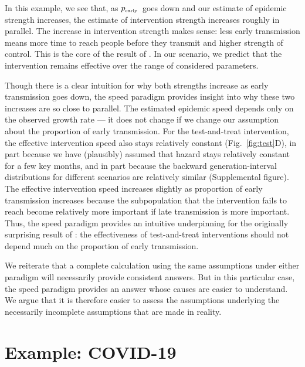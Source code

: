 \documentclass[12pt]{article}
\newcommand{\tsub}[2]{#1_{{\textrm{\tiny #2}}}}
\newcommand{\pEarly}{\ensuremath{\tsub{p}{early}}}
\newcommand{\figref}[1]{Fig.~\ref{fig:#1}}
\begin{document}
In this example, we see that, as \pEarly\ goes down and our estimate of epidemic strength increases, the estimate of intervention strength increases roughly in parallel. The increase in intervention strength makes sense: less early transmission means more time to reach people before they transmit and higher strength of control. This is the core of the result of \cite{eaton2014proportion}. 
In our scenario, we predict that the intervention remains effective over the range of considered parameters.

Though there is a clear intuition for why both strengths increase as early transmission goes down, the speed paradigm provides insight into why these two increases are so close to parallel.
The estimated epidemic speed depends only on the observed growth rate --- it does not change if we change our assumption about the proportion of early transmission.
For the test-and-treat intervention, the effective intervention speed also stays relatively constant (\figref{test}D), in part because we have (plausibly) assumed that hazard stays relatively constant for a few key months, and in part because the backward generation-interval distributions for different scenarios are relatively similar (Supplemental figure).
The effective intervention speed increases slightly as proportion of early transmission increases because the subpopulation that the intervention fails to reach become relatively more important if late transmission is more important.
Thus, the speed paradigm provides an intuitive underpinning for the originally surprising result of \cite{eaton2014proportion}: the effectiveness of test-and-treat interventions should not depend much on the proportion of early transmission.

We reiterate that a complete calculation using the same assumptions under either paradigm will necessarily provide consistent answers. But in this particular case, the speed paradigm provides an answer whose causes are easier to understand. We argue that it is therefore easier to assess the assumptions underlying the necessarily incomplete assumptions that are made in reality.

\section{Example: COVID-19}
\end{document}
